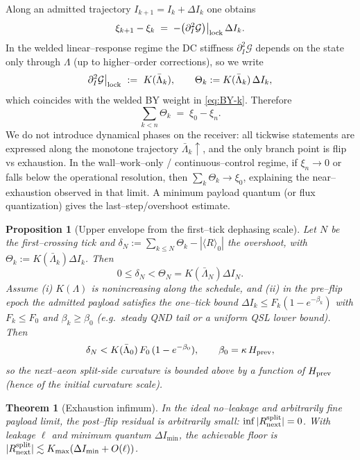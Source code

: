 \documentclass[10pt]{article}
\theoremstyle{definition}
\theoremstyle{plain}
\newtheorem{theorem}{Theorem}[section]
\newtheorem{proposition}{Proposition}[section]
\begin{document}
Along an admitted trajectory $I_{k+1}=I_k+\Delta I_k$ one obtains
\begin{equation}
\xi_{k+1}-\xi_k\;=\;-\big(\partial_I^2\mathcal G\big)\big|_{\rm lock}\,\Delta I_k.
\label{eq:xi-step}
\end{equation}
In the welded linear--response regime the DC stiffness $\partial_I^2\mathcal G$ depends on the state only
through $\Lambda$ (up to higher--order corrections), so we write
\[
\partial_I^2\mathcal G\big|_{\rm lock}\ :=\ K(\bar\Lambda_k),\qquad
\Theta_k:=K(\bar\Lambda_k)\,\Delta I_k,
\]
which coincides with the welded BY weight in \eqref{eq:BY-k}. Therefore
\begin{equation}
\sum_{k<n}\Theta_k\;=\;\xi_0-\xi_n.
\label{eq:budget-identity}
\end{equation}
We do not introduce dynamical phases on the receiver: all tickwise statements are expressed along the
monotone trajectory $\bar\Lambda_k\uparrow$, and the only branch point is flip vs exhaustion.
In the wall--work--only / continuous--control regime, if $\xi_n\to 0$ or falls below the operational resolution,
then $\sum_k\Theta_k\to\xi_0$, explaining the near--exhaustion observed in that limit. A minimum payload quantum
(or flux quantization) gives the last--step/overshoot estimate.

\begin{proposition}[Upper envelope from the first--tick dephasing scale]
\label{prop:upper-envelope}
Let $N$ be the first--crossing tick and $\delta_N:=\sum_{k\le N}\Theta_k-|\langle R\rangle_0|$ the overshoot,
with $\Theta_k:=K(\bar\Lambda_k)\Delta I_k$. Then
\[
0\le \delta_N<\Theta_N=K(\bar\Lambda_N)\Delta I_N.
\]
Assume (i) $K(\Lambda)$ is nonincreasing along the schedule, and (ii) in the pre--flip epoch the admitted
payload satisfies the one--tick bound $\Delta I_k\le F_k(1-e^{-\beta_k})$ with $F_k\le F_0$ and
$\beta_k\ge\beta_0$ (e.g.\ steady QND tail or a uniform QSL lower bound). Then
\[
\delta_N < K(\bar\Lambda_0)\,F_0\,(1-e^{-\beta_0}),
\qquad \beta_0=\kappa\,H_{\rm prev},
\]
so the next--aeon split-side curvature is bounded above by a function of $H_{\rm prev}$ (hence of the
initial curvature scale).
\end{proposition}

\begin{theorem}[Exhaustion infimum]
\label{thm:exhaustion-infimum}
In the ideal no--leakage and arbitrarily fine payload limit, the post--flip residual is arbitrarily small:
\(\inf |R_{\rm next}^{\rm split}|=0\). With leakage $\ell$ and minimum quantum $\Delta I_{\min}$, the achievable
floor is \(|R_{\rm next}^{\rm split}|\lesssim K_{\max}(\Delta I_{\min}+O(\ell))\).
\end{theorem}
\end{document}
